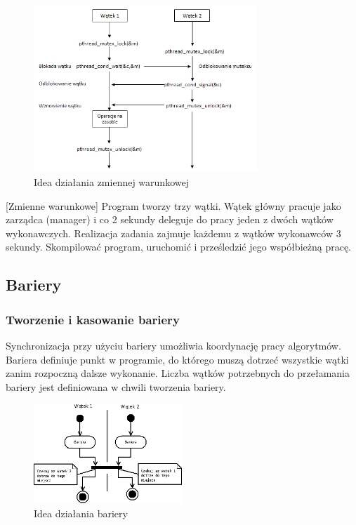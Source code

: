 \begin{figure}[!h]
\centering
\includegraphics[width=0.75\textwidth]{img/condvar}
\caption{Idea działania zmiennej warunkowej}
\label{fig:K0XHJ}
\end{figure}

\begin{example}{[Zmienne warunkowe]}
Program tworzy trzy wątki. Wątek główny pracuje jako zarządca (manager) i co 2 sekundy deleguje do pracy jeden z dwóch wątków wykonawczych. Realizacja zadania zajmuje każdemu z wątków wykonawców 3 sekundy. Skompilować program, uruchomić i prześledzić jego współbieżną pracę.

\end{example}

\subsection{Bariery}

\subsubsection{Tworzenie i kasowanie bariery}

Synchronizacja przy użyciu bariery umożliwia koordynację pracy algorytmów. Bariera definiuje punkt w programie, do którego muszą dotrzeć wszystkie wątki zanim rozpoczną dalsze wykonanie. Liczba wątków potrzebnych do przełamania bariery jest definiowana w chwili tworzenia bariery.

\begin{figure}[!h]
\centering
\includegraphics[width=0.5\textwidth]{img/thrd_barrier}
\caption{Idea działania bariery}
\label{fig:thrd_barrier}
\end{figure}

